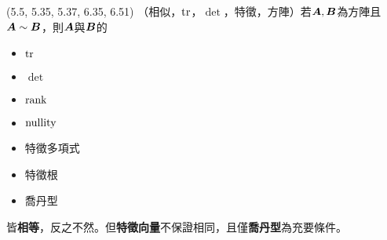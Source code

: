 \item \begin{theorem}{(5.5, 5.35, 5.37, 6.35, 6.51)} （相似，$\operatorname{tr}$，$\det$，特徵，方陣）若$\boldsymbol{A}, \boldsymbol{B}$為方陣且$\boldsymbol{A} \sim \boldsymbol{B}$，則$\boldsymbol{A}$與$\boldsymbol{B}$的
	\begin{itemize}
		\item $\operatorname{tr}$
		\item $\det$
		\item $\operatorname{rank}$
		\item $\operatorname{nullity}$
		\item 特徵多項式
		\item 特徵根
		\item 喬丹型
	\end{itemize}
	皆\textbf{相等}，反之不然。但\textbf{特徵向量}不保證相同，且僅\textbf{喬丹型}為充要條件。
\end{theorem}

